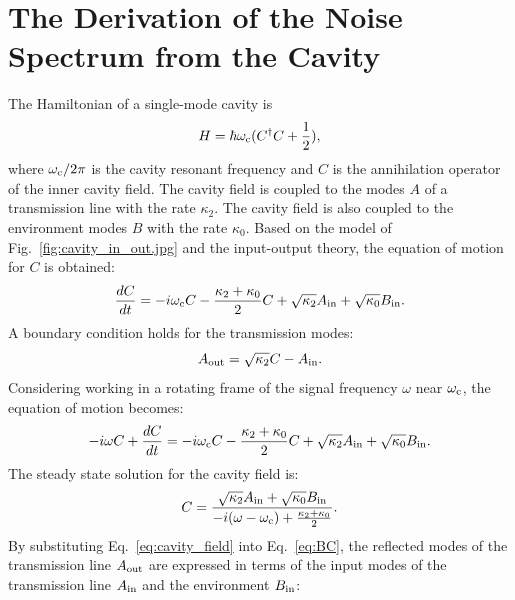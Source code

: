 \section{The Derivation of the Noise Spectrum from the Cavity} 
\label{sec:cavitynoise}

The Hamiltonian of a single-mode cavity is
\begin{equation}
\label{eq:cavity_Hamiltonian}
    H = \hbar \omega_{\rm c}(C^{\dagger}C+\frac{1}{2}),
\end{equation}
where $\omega_{\rm c}/2\pi$ is the cavity resonant frequency and $C$ is the 
annihilation operator of the inner cavity field. The cavity field is coupled 
to the modes $A$ of a transmission line with the rate $\kappa_2$. The cavity 
field is also coupled to the environment modes $B$ with the rate $\kappa_0$. 
Based on the model of Fig.~\ref{fig:cavity_in_out.jpg} and the input-output 
theory, the equation of motion for $C$ is obtained:
\begin{equation}
\label{eq:EOM}
    \frac{dC}{dt} = -i\omega_{\rm c} C - \frac{\kappa_2+\kappa_0}{2} C + \sqrt{\kappa_2} A_{\rm in} + \sqrt{\kappa_0}B_{\rm in}.
\end{equation}
A boundary condition holds for the transmission modes:
\begin{equation}
\label{eq:BC}
    A_{\rm out} = \sqrt{\kappa_2} C - A_{\rm in}.
\end{equation}
Considering working in a rotating frame of the signal frequency $\omega$ near 
$\omega_{\rm c}$, the equation of motion becomes:
\begin{equation}
\label{eq:EOM_rotating_frame}
    -i\omega C + \frac{dC}{dt} = -i \omega_{\rm c} C - \frac{\kappa_2+\kappa_0}{2} C + \sqrt{\kappa_2} A_{\rm in} + \sqrt{\kappa_0} B_{\rm in}.
\end{equation}
The steady state solution for the cavity field is: 
\begin{equation}
\label{eq:cavity_field}
    C = \frac {\sqrt{\kappa_2} A_{\rm in} + \sqrt{\kappa_0} B_{\rm in}} {-i (\omega-\omega_{\rm c}) + \frac{\kappa_2+\kappa_0}{2} }.
\end{equation}
By substituting Eq.~\eqref{eq:cavity_field} into Eq.~\eqref{eq:BC}, the 
reflected modes of the transmission line $A_{\rm out}$ are expressed in terms 
of the input modes of the transmission line $A_{\rm in}$ and the environment 
$B_{\rm in}$:
